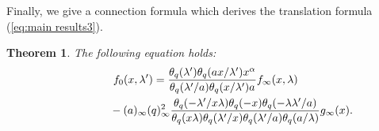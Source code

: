 \documentclass[pdftex]{sigma}
\numberwithin{equation}{section}
\newtheorem{thm}{Theorem}[section]
\theoremstyle{definition}
\begin{document}
Finally, we give a connection formula which derives the translation formula (\ref{eq:main results3}).
\begin{thm}
The following equation holds:
\label{thm:tuchimi connection}
\begin{gather}
f_{0}(x,\lambda^{\prime})
 =
 \frac{\theta_q(\lambda^{\prime})\theta_q(ax/\lambda^{\prime})x^\alpha}{\theta_q(\lambda^{\prime}/a)\theta_q(x/\lambda^{\prime})a}f_{\infty}(x,\lambda) \nonumber \\
\label{eq:tuchimi connection}
\hphantom{f_{0}(x,\lambda^{\prime})=}{}
 -
 (a)_\infty(q)_\infty^2\frac{\theta_q(-\lambda^{\prime}/x\lambda)\theta_q(-x)\theta_q(-\lambda\lambda^{\prime}/a)}{\theta_q(x\lambda)\theta_q(\lambda^{\prime}/x)\theta_q(\lambda^{\prime}/a)\theta_q(a/\lambda)}g_{\infty }(x).
\end{gather}
\end{thm}
\end{document}
